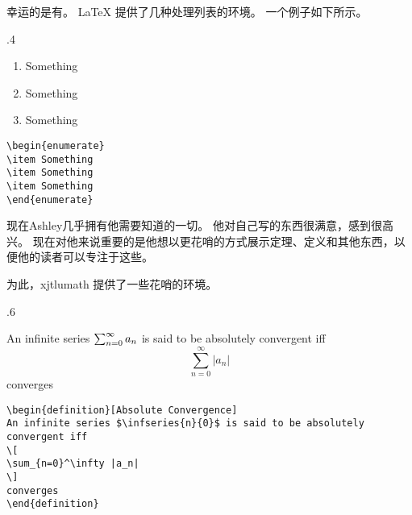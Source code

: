 幸运的是有。 \LaTeX{} 提供了几种处理列表的环境。 一个例子如下所示。

\begin{miniexammar}{.4\textandmarginlen}{
\begin{enumerate}
\item Something
\item Something
\item Something
\end{enumerate}
}
\begin{lstlisting}
\begin{enumerate}
\item Something
\item Something
\item Something
\end{enumerate}
\end{lstlisting}
\end{miniexammar}

现在Ashley几乎拥有他需要知道的一切。 他对自己写的东西很满意，感到很高兴。 现在对他来说重要的是他想以更花哨的方式展示定理、定义和其他东西，以便他的读者可以专注于这些。

为此，xjtlumath 提供了一些花哨的环境。

\begin{miniexammar}{.6\textandmarginlen}{
\begin{definition}
An infinite series $\sum_{n=0}^{\infty}{a_{n}}$ is said to be absolutely convergent iff
\[
\sum_{n=0}^\infty |a_n|
\]
converges
\end{definition}
}
\begin{lstlisting}
\begin{definition}[Absolute Convergence]
An infinite series $\infseries{n}{0}$ is said to be absolutely convergent iff
\[
\sum_{n=0}^\infty |a_n|
\]
converges
\end{definition}
\end{lstlisting}
\end{miniexammar}

